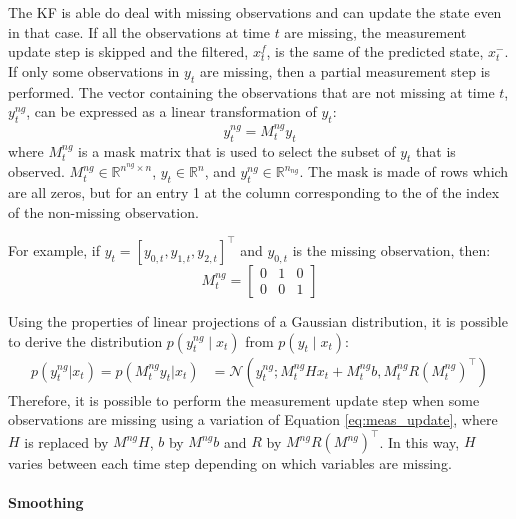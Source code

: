 \documentclass{article}
\newcommand{\norm}[3]{\mathcal{N}\left(#1; #2, #3\right)} %
\begin{document}
The KF is able do deal with missing observations and can update the state even in that case.
If all the observations at time $t$ are missing, the measurement update step is skipped and the filtered, $x^f_t$, is the same of the predicted state, $x_t^-$. If only some observations in $y_t$ are missing, then a partial measurement step is performed.
The vector containing the observations that are not missing at time $t$, $y^{ng}_t$, can be expressed as a linear transformation of $y_t$:
\begin{equation}\label{eq:miss_obs}
    y^{ng}_t = M^{ng}_ty_t
\end{equation}
where $M^{ng}_t$ is a mask matrix that is used to select the subset of $y_t$ that is observed. $M_t^{ng} \in \mathbb{R}^{n^{ng} \times n}$, $y_t \in \mathbb{R}^n$, and $y_t^{ng} \in \mathbb{R}^{n_{ng}}$. The mask is made of rows which are all zeros, but for an entry 1 at the column corresponding to the of the index of the non-missing observation.

For example, if $y_t = [y_{0,t}, y_{1,t}, y_{2,t}]^\top$ and $y_{0,t}$ is the missing observation, then:
\begin{equation*}
 M^{ng}_t = \left[\begin{array}{ccc}
    0 & 1 & 0 \\
    0 & 0 & 1
\end{array}\right]
\end{equation*}

Using the properties of linear projections of a Gaussian distribution, it is possible to derive the distribution $p(y^{ng}_t \mid x_t)$ from $p(y_t \mid x_t)$:
 \begin{align*}
   p(y^{ng}_t|x_t) = p(M^{ng}_ty_t|x_t) &=   \norm{y^{ng}_t}{M^{ng}_tHx_t + M^{ng}_tb}{M^{ng}_tR(M^{ng}_t)^\top}%
\end{align*}
Therefore, it is possible to perform the measurement update step when some observations are missing using a variation of Equation \ref{eq:meas_update}, where $H$ is replaced by $M^{ng}H$, $b$ by $M^{ng}b$ and $R$ by $M^{ng}R(M^{ng})^\top$. In this way, $H$ varies between each time step depending on which variables are missing.

\paragraph{Smoothing}
\end{document}
